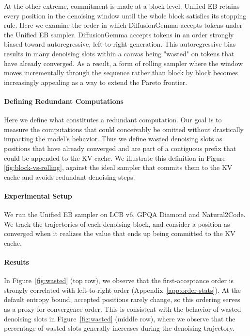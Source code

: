 At the other extreme, commitment is made at a block level: Unified EB retains every position in the denoising window until the whole block satisfies its stopping rule.
Here we examine the order in which DiffusionGemma accepts tokens under the Unified EB sampler.
DiffusionGemma accepts tokens in an order strongly biased toward autoregressive, left-to-right generation.
This autoregressive bias results in many denoising slots within a canvas being "wasted" on tokens that have already converged.
As a result, a form of rolling sampler where the window moves incrementally through the sequence rather than block by block becomes increasingly appealing as a way to extend the Pareto frontier.



\paragraph{Defining Redundant Computations}
Here we define what constitutes a redundant computation.
Our goal is to measure the computations that could conceivably be omitted without drastically impacting the model's behavior.
Thus we define wasted denoising slots as positions that have already converged and are part of a contiguous prefix that could be appended to the KV cache.
We illustrate this definition in Figure \ref{fig:block-vs-rolling}, against the ideal sampler that commits them to the KV cache and avoids redundant denoising steps.



\paragraph{Experimental Setup}
We run the Unified EB sampler on LCB v6, GPQA Diamond and Natural2Code. We track the trajectories of each denoising block, and consider a position as converged when it realizes the value that ends up being committed to the KV cache.

\paragraph{Results}
In Figure~\ref{fig:wasted} (top row), we observe that the first-acceptance order is strongly correlated with left-to-right order (Appendix~\ref{app:order-stats}). At the default entropy bound, accepted positions rarely change, so this ordering serves as a proxy for convergence order. This is consistent with the behavior of wasted denoising slots in Figure~\ref{fig:wasted} (middle row), where we observe that the percentage of wasted slots generally increases during the denoising trajectory.

